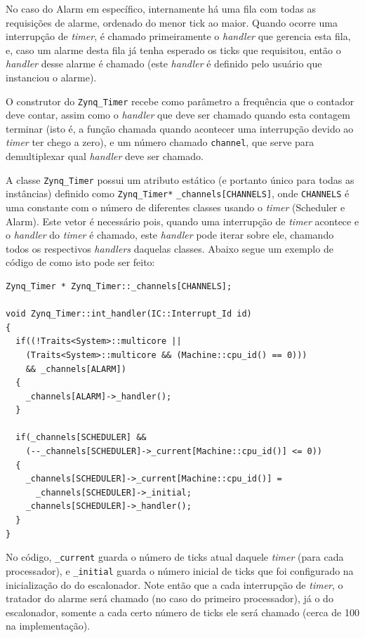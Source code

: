 No caso do Alarm em específico, internamente há uma fila com todas as requisições de alarme, ordenado do menor tick ao maior. Quando ocorre uma interrupção de \emph{timer}, é chamado primeiramente o \emph{handler} que gerencia esta fila, e, caso um alarme desta fila já tenha esperado os ticks que requisitou, então o \emph{handler} desse alarme é chamado (este \emph{handler} é definido pelo usuário que instanciou o alarme).


O construtor do \verb+Zynq_Timer+ recebe como parâmetro a frequência que o contador deve contar, assim como o \emph{handler} que deve ser chamado quando esta contagem terminar (isto é, a função chamada quando acontecer uma interrupção devido ao \emph{timer} ter chego a zero), e um número chamado \verb+channel+, que serve para demultiplexar qual \emph{handler} deve ser chamado.

A classe \verb+Zynq_Timer+ possui um atributo estático (e portanto único para todas as instâncias) definido como \verb+Zynq_Timer*+ \verb+_channels[CHANNELS]+, onde \verb+CHANNELS+ é uma constante com o número de diferentes classes usando o \emph{timer} (Scheduler e Alarm). Este vetor é necessário pois, quando uma interrupção de \emph{timer} acontece e o \emph{handler} do \emph{timer} é chamado, este \emph{handler} pode iterar sobre ele, chamando todos os respectivos \emph{handlers} daquelas classes. Abaixo segue um exemplo de código de como isto pode ser feito:


\label{int_handler}
\begin{lstlisting}
Zynq_Timer * Zynq_Timer::_channels[CHANNELS];

void Zynq_Timer::int_handler(IC::Interrupt_Id id)
{
  if((!Traits<System>::multicore ||
    (Traits<System>::multicore && (Machine::cpu_id() == 0)))
    && _channels[ALARM])
  {
    _channels[ALARM]->_handler();
  }

  if(_channels[SCHEDULER] &&
    (--_channels[SCHEDULER]->_current[Machine::cpu_id()] <= 0))
  {
    _channels[SCHEDULER]->_current[Machine::cpu_id()] =
      _channels[SCHEDULER]->_initial;
    _channels[SCHEDULER]->_handler();
  }
}
\end{lstlisting}

No código, \verb+_current+ guarda o número de ticks atual daquele \emph{timer} (para cada processador), e \verb+_initial+ guarda o número inicial de ticks que foi configurado na inicialização do do escalonador. Note então que a cada interrupção de \emph{timer}, o tratador do alarme será chamado (no caso do primeiro processador), já o do escalonador, somente a cada certo número de ticks ele será chamado (cerca de 100 na implementação).

